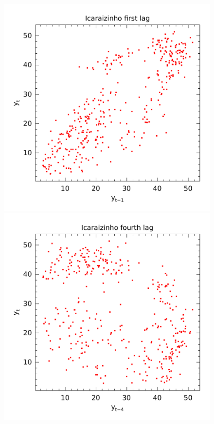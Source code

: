 \begin{figure}
  \centering
  \begin{minipage}[t]{0.45\linewidth}
    \centering
    \begin{minipage}[t]{\linewidth}
      \centering     \includegraphics[width=\textwidth]{Figuras/Icaraizinho/icaraizinho-1-lag.pdf}
    \end{minipage}
    \begin{minipage}[b]{\linewidth}
      \centering     \includegraphics[width=\textwidth]{Figuras/Icaraizinho/icaraizinho-4-lag.pdf}

\end{minipage}
\end{minipage}
\end{figure}
